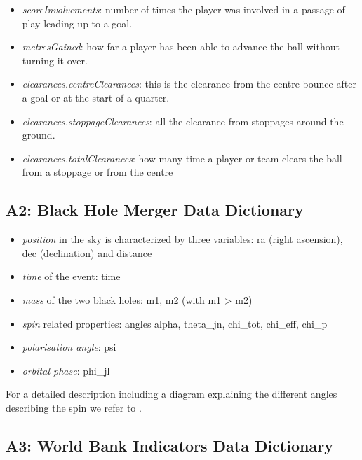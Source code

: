 \begin{itemize}
\item
  \emph{scoreInvolvements}: number of times the player was involved in a passage of play leading up to a goal.
\item
  \emph{metresGained}: how far a player has been able to advance the ball without turning it over.
\item
  \emph{clearances.centreClearances}: this is the clearance from the centre bounce after a goal or at the start of a quarter.
\item
  \emph{clearances.stoppageClearances}: all the clearance from stoppages around the ground.
\item
  \emph{clearances.totalClearances}: how many time a player or team clears the ball from a stoppage or from the centre
\end{itemize}

\subsection{A2: Black Hole Merger Data Dictionary}\label{a2-black-hole-merger-data-dictionary}

\begin{itemize}
\tightlist
\item
  \emph{position} in the sky is characterized by three variables: ra (right ascension), dec (declination) and distance
\item
  \emph{time} of the event: time
\item
  \emph{mass} of the two black holes: m1, m2 (with m1 \textgreater{} m2)
\item
  \emph{spin} related properties: angles alpha, theta\_jn, chi\_tot, chi\_eff, chi\_p
\item
  \emph{polarisation angle}: psi
\item
  \emph{orbital phase}: phi\_jl
\end{itemize}

For a detailed description including a diagram explaining the different angles describing the spin we refer to \citet{Smith:2016qas}.

\subsection{A3: World Bank Indicators Data Dictionary}\label{a3-world-bank-indicators-data-dictionary}

